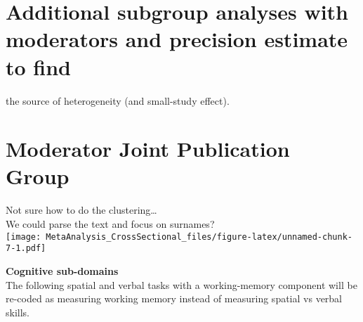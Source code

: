 \documentclass[
]{book}
\begin{document}
\hypertarget{additional-subgroup-analyses-with-moderators-and-precision-estimate-to-find}{%
\section{Additional subgroup analyses with moderators and precision estimate to find}\label{additional-subgroup-analyses-with-moderators-and-precision-estimate-to-find}}

the source of heterogeneity (and small-study effect).

\hypertarget{moderator-joint-publication-group}{%
\section{Moderator Joint Publication Group}\label{moderator-joint-publication-group}}

Not sure how to do the clustering\ldots{}\\
We could parse the text and focus on surnames?\\
\texttt{[image: MetaAnalysis\_CrossSectional\_files/figure-latex/unnamed-chunk-7-1.pdf]}

\textbf{Cognitive sub-domains}\\
The following spatial and verbal tasks with a working-memory component will be re-coded
as measuring working memory instead of measuring spatial vs verbal skills.
\end{document}
